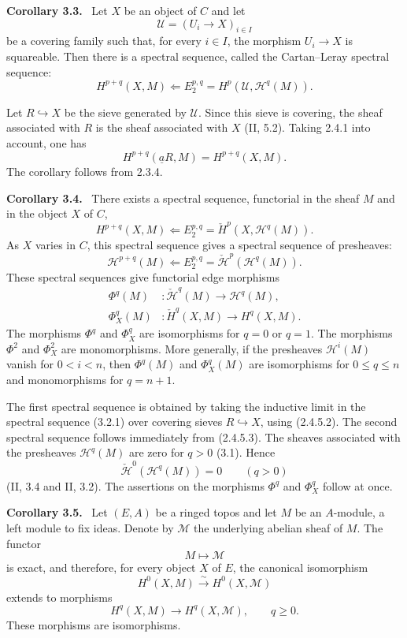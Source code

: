 \documentclass[11pt]{article}
\newcommand{\Hh}{\mathcal{H}}
\newenvironment{statement}[1]{\par\medskip\noindent\textbf{#1.}\ }{\par\medskip}
\begin{document}
\begin{statement}{Corollary 3.3}
Let $X$ be an object of $C$ and let
\[
\mathcal U=(U_i\to X)_{i\in I}
\]
be a covering family such that, for every $i\in I$, the morphism $U_i\to X$ is squareable. Then there is a spectral sequence, called the Cartan--Leray spectral sequence:
\[
H^{p+q}(X,M)\Longleftarrow
E_2^{p,q}=H^p(\mathcal U,\Hh^q(M)).
\tag{3.3.1}
\]
\end{statement}

Let $R\hookrightarrow X$ be the sieve generated by $\mathcal U$. Since this sieve is covering, the sheaf associated with $R$ is the sheaf associated with $X$ (II, 5.2). Taking 2.4.1 into account, one has
\[
H^{p+q}(\underline a R,M)=H^{p+q}(X,M).
\]
The corollary follows from 2.3.4.

\begin{statement}{Corollary 3.4}
There exists a spectral sequence, functorial in the sheaf $M$ and in the object $X$ of $C$,
\[
H^{p+q}(X,M)\Longleftarrow
E_2^{p,q}=\check H^p(X,\Hh^q(M)).
\tag{3.4.1}
\]
As $X$ varies in $C$, this spectral sequence gives a spectral sequence of presheaves:
\[
\Hh^{p+q}(M)\Longleftarrow
E_2^{p,q}=\check{\Hh}^p(\Hh^q(M)).
\tag{3.4.2}
\]
These spectral sequences give functorial edge morphisms
\begin{align*}
\Phi^q(M)&:\check{\Hh}^q(M)\longrightarrow \Hh^q(M),\tag{3.4.3}\\
\Phi_X^q(M)&:\check H^q(X,M)\longrightarrow H^q(X,M).\tag{3.4.4}
\end{align*}
The morphisms $\Phi^q$ and $\Phi_X^q$ are isomorphisms for $q=0$ or $q=1$. The morphisms $\Phi^2$ and $\Phi_X^2$ are monomorphisms. More generally, if the presheaves $\Hh^i(M)$ vanish for $0<i<n$, then $\Phi^q(M)$ and $\Phi_X^q(M)$ are isomorphisms for $0\leq q\leq n$ and monomorphisms for $q=n+1$.
\end{statement}

The first spectral sequence is obtained by taking the inductive limit in the spectral sequence (3.2.1) over covering sieves $R\hookrightarrow X$, using (2.4.5.2). The second spectral sequence follows immediately from (2.4.5.3). The sheaves associated with the presheaves $\Hh^q(M)$ are zero for $q>0$ (3.1). Hence
\[
\check{\Hh}^0(\Hh^q(M))=0
\qquad (q>0)
\]
(II, 3.4 and II, 3.2). The assertions on the morphisms $\Phi^q$ and $\Phi_X^q$ follow at once.

\begin{statement}{Corollary 3.5}
Let $(E,A)$ be a ringed topos and let $M$ be an $A$-module, a left module to fix ideas. Denote by $\mathcal M$ the underlying abelian sheaf of $M$. The functor
\[
M\longmapsto \mathcal M
\]
is exact, and therefore, for every object $X$ of $E$, the canonical isomorphism
\[
H^0(X,M)\xrightarrow{\sim}H^0(X,\mathcal M)
\]
extends to morphisms
\[
H^q(X,M)\longrightarrow H^q(X,\mathcal M),\qquad q\geq0.
\]
These morphisms are isomorphisms.
\end{statement}
\end{document}

